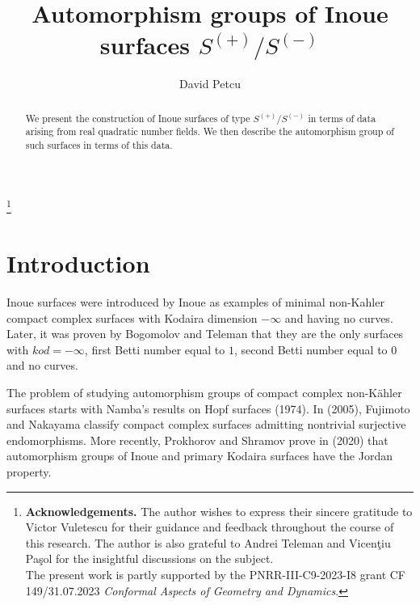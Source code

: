\documentclass[12pt]{amsart}
\newcommand\blfootnote[1]{%
  \begin{NoHyper}%
  \renewcommand\thefootnote{}\footnote{#1}%
  \addtocounter{footnote}{-1}%
  \end{NoHyper}%
}
\begin{document}
\title{Automorphism groups of Inoue surfaces $S^{(+)}/S^{(-)}$}
\author{David Petcu}
\address{
		\textsc{\indent University of Bucharest, Faculty of Mathematics and Computer Science\newline 
			 Academiei Str., Bucharest, Romania \newline
			\indent \indent and \newline
			\indent Institute of Mathematics ``Simion Stoilow'' of the Romanian Academy\newline 
			 Calea Grivitei Street, 010702, Bucharest, Romania}}

\begin{abstract}
We present the construction of Inoue surfaces of type $S^{(+)}/S^{(-)}$ in terms of data arising from real quadratic number fields. We then describe the automorphism group of such surfaces in terms of this data.
\end{abstract}


\blfootnote{{\bf Acknowledgements.} The author wishes to express their sincere gratitude to Victor Vuletescu for their guidance and feedback throughout the course of this research. The author is also grateful to Andrei Teleman and Vicen\c tiu Pa\c sol for the insightful discussions on the subject.\\
The present work is partly supported by the PNRR-III-C9-2023-I8 grant CF 149/31.07.2023 {\em Conformal Aspects of Geometry and Dynamics}. }


\maketitle

\section{Introduction}

Inoue surfaces were introduced by Inoue as examples of minimal  non-Kahler compact complex surfaces with Kodaira dimension $-\infty$ and having no curves. Later, it was proven by Bogomolov \cite{Bog} and Teleman \cite{Tel} that they are the only surfaces  with $kod=-\infty$, first Betti number equal to $1$, second Betti number equal to $0$ and no curves.\par

\noindent
The problem of studying automorphism groups of compact complex non-K\"ahler surfaces starts with Namba's results on Hopf surfaces \cite{Nam} (1974). In \cite{FN} (2005), Fujimoto and Nakayama classify compact complex surfaces admitting nontrivial surjective endomorphisms. More recently, Prokhorov and Shramov prove in \cite{PrSh} (2020) that automorphism groups of Inoue and primary Kodaira surfaces have the Jordan property.\par
\end{document}
